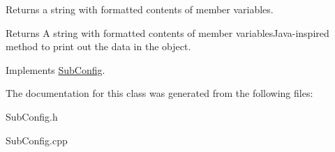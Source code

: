 Returns a string with formatted contents of member variables. 

\begin{DoxyReturn}{Returns}
A string with formatted contents of member variables\+Java-\/inspired method to print out the data in the object. 
\end{DoxyReturn}


Implements \hyperlink{classSubConfig_aaaef674182db54e8d13eec1456e1ab5b}{Sub\+Config}.



The documentation for this class was generated from the following files\+:\begin{DoxyCompactItemize}
\item 
Sub\+Config.\+h\item 
Sub\+Config.\+cpp\end{DoxyCompactItemize}
